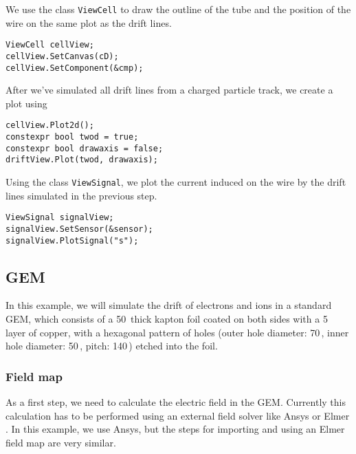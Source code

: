 We use the class \texttt{ViewCell} to draw the
outline of the tube and the position of the wire on the same plot as the
drift lines.
\begin{lstlisting}
ViewCell cellView;
cellView.SetCanvas(cD);
cellView.SetComponent(&cmp);
\end{lstlisting}
After we've simulated all drift lines from a charged particle 
track, we create a plot using
\begin{lstlisting}
cellView.Plot2d();
constexpr bool twod = true;
constexpr bool drawaxis = false;
driftView.Plot(twod, drawaxis);
\end{lstlisting}

Using the class \texttt{ViewSignal}, we plot the current induced on 
the wire by the drift lines simulated in the previous step.
\begin{lstlisting}
ViewSignal signalView;
signalView.SetSensor(&sensor);
signalView.PlotSignal("s");
\end{lstlisting}

\subsection{GEM}\label{Sec:ExampleGem}
In this example, we will simulate the drift of electrons and ions 
in a standard GEM, which consists of a 50\, thick kapton foil 
coated on both sides with a 5\, layer of copper, 
with a hexagonal pattern of holes (outer hole diameter: 70\,, 
inner hole diameter: 50\,, pitch: 140\,) 
etched into the foil.
\subsubsection{Field map}
As a first step, we need to calculate the electric field in the GEM. 
Currently this calculation has to be performed using an external field 
solver like Ansys \cite{ANSYS} or Elmer \cite{Elmer}. In this example, 
we use Ansys, but the steps for importing and using an Elmer field map 
are very similar.

